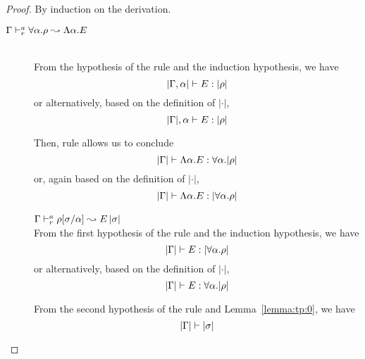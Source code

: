 \begin{proof}

  By induction on the derivation.
\begin{description}
\item[\quad$\Gamma \vdash^a_{r} \forall \alpha.\rho \leadsto \Lambda \alpha.E$] \ \\

  From the hypothesis of the rule and the induction hypothesis, we have
\begin{equation*}
  |\Gamma, \alpha| \vdash E : |\rho|
\end{equation*}
  or alternatively, based on the definition of $|\cdot|$,
\begin{equation*}
  |\Gamma|, \alpha \vdash E : |\rho|
\end{equation*}
 
  Then, rule  allows us to conclude
\begin{equation*}
  |\Gamma| \vdash \Lambda \alpha. E : \forall \alpha.|\rho|
\end{equation*}
  or, again based on the definition of $|\cdot|$,
\begin{equation*}
  |\Gamma| \vdash \Lambda \alpha. E : |\forall \alpha.\rho|
\end{equation*}

\item[]\quad$\Gamma \vdash^a_{r} \rho [\sigma/\alpha] \leadsto E\,|\sigma|$ \ \\

  From the first hypothesis of the rule and the induction hypothesis, we have
\begin{equation*}
  |\Gamma| \vdash E : |\forall \alpha. \rho|
\end{equation*}
  or alternatively, based on the definition of $|\cdot|$,
\begin{equation*}
  |\Gamma| \vdash E : \forall \alpha. |\rho|
\end{equation*}

  From the second hypothesis of the rule and Lemma~\ref{lemma:tp:0}, we have
\begin{equation*}
  |\Gamma| \vdash |\sigma|
\end{equation*}


\end{description}
\end{proof}
